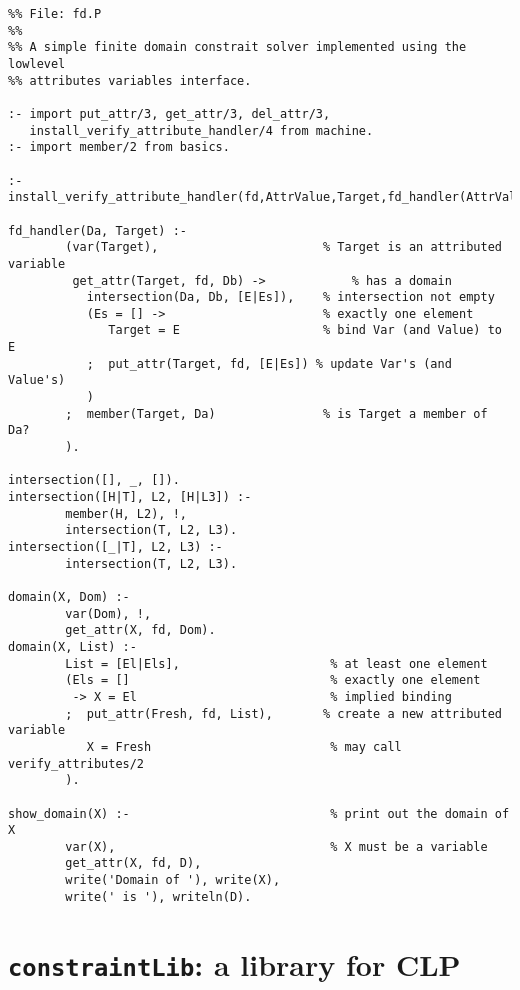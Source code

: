 \begin{small}
\begin{verbatim}
%% File: fd.P
%%
%% A simple finite domain constrait solver implemented using the lowlevel 
%% attributes variables interface.  

:- import put_attr/3, get_attr/3, del_attr/3, 
   install_verify_attribute_handler/4 from machine.
:- import member/2 from basics.

:- install_verify_attribute_handler(fd,AttrValue,Target,fd_handler(AttrValue,Target)).

fd_handler(Da, Target) :-
        (var(Target),                       % Target is an attributed variable
         get_attr(Target, fd, Db) ->            % has a domain
           intersection(Da, Db, [E|Es]),    % intersection not empty
           (Es = [] ->                      % exactly one element
              Target = E                    % bind Var (and Value) to E
           ;  put_attr(Target, fd, [E|Es]) % update Var's (and Value's)
           )
        ;  member(Target, Da)               % is Target a member of Da?
        ).

intersection([], _, []).
intersection([H|T], L2, [H|L3]) :-
        member(H, L2), !,
        intersection(T, L2, L3).
intersection([_|T], L2, L3) :-
        intersection(T, L2, L3).

domain(X, Dom) :- 
        var(Dom), !, 
        get_attr(X, fd, Dom). 
domain(X, List) :- 
        List = [El|Els],                     % at least one element 
        (Els = []                            % exactly one element
         -> X = El                           % implied binding 
        ;  put_attr(Fresh, fd, List),       % create a new attributed variable
           X = Fresh                         % may call verify_attributes/2
        ).

show_domain(X) :-                            % print out the domain of X
        var(X),                              % X must be a variable
        get_attr(X, fd, D),
        write('Domain of '), write(X),
        write(' is '), writeln(D).

\end{verbatim}
\end{small}

\section{{\tt constraintLib}: a library for CLP} \label{constraintLib}

